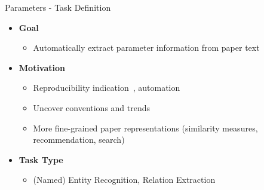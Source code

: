 \documentclass[en,16:9,smallfoot]{sdqbeamer}
\begin{document}
   \begin{frame}{Parameters - Task Definition}
   \begin{itemize}
       \item \textbf{Goal}
       \begin{itemize}
           \item Automatically extract parameter information from paper text
       \end{itemize}
       \item \textbf{Motivation}
       \begin{itemize}
           \item Reproducibility indication~\cite{Radd2019}, automation~\cite{sethi2018}
           \item Uncover conventions and trends
           \item More fine-grained paper representations (similarity measures, recommendation, search)
       \end{itemize}
       \item \textbf{Task Type}
       \begin{itemize}
           \item (Named) Entity Recognition, Relation Extraction \hphantom{mmmmm} 
       \end{itemize}
   \end{itemize}
   \end{frame}
\end{document}
